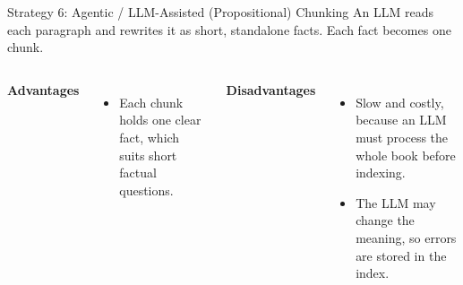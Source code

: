 \documentclass[aspectratio=169,10pt]{beamer}
\begin{document}
\begin{frame}[t]{Strategy 6: Agentic / LLM-Assisted (Propositional) Chunking}
\small
An LLM reads each paragraph and rewrites it as short, standalone facts. Each fact becomes one chunk.
\vspace{14pt}
\begin{center}
\end{center}
\vspace{10pt}
\begin{columns}[T]
\textbf{Advantages}
\begin{itemize}
  \item Each chunk holds one clear fact, which suits short factual questions.
\end{itemize}
\textbf{Disadvantages}
\begin{itemize}
  \item Slow and costly, because an LLM must process the whole book before indexing.
  \item The LLM may change the meaning, so errors are stored in the index.
\end{itemize}
\end{columns}
\end{frame}
\end{document}
